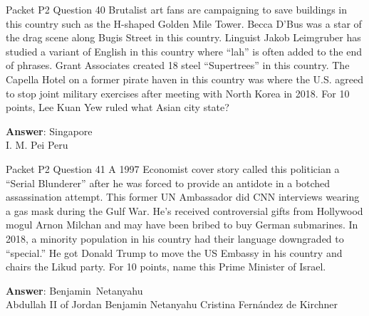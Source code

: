 \begin{frame}{Packet P2 Question 40}
Brutalist art fans are campaigning to save buildings in this country   such as the H-shaped Golden Mile Tower. Becca D'Bus was a star of the drag scene along Bugis Street in this country. Linguist Jakob Leimgruber has studied a variant of English in this country where ``lah'' is often added to the end of phrases. Grant Associates created 18 steel “Supertrees” in this country. The Capella Hotel on a former pirate haven in this country was where the U.S. agreed to stop joint military exercises after meeting with North Korea in 2018. For 10 points, Lee Kuan Yew ruled     what Asian city state?  

\textbf{Answer}: Singapore\\
 I. M. Pei
 Peru
\end{frame}

\begin{frame}{Packet P2 Question 41}
A 1997 Economist cover story called this politician a “Serial Blunderer” after he was forced to provide an antidote in a botched assassination attempt. This former   UN Ambassador did CNN interviews wearing a gas mask during the Gulf War. He’s received controversial gifts from Hollywood mogul Arnon Milchan and may have been bribed to buy German submarines. In 2018, a minority population in his country had their language downgraded to “special.” He got Donald Trump to move the US Embassy in his country and chairs the Likud party. For 10 points, name this Prime   Minister of Israel.    

\textbf{Answer}: Benjamin\ Netanyahu\\
 Abdullah II of Jordan
 Benjamin Netanyahu
 Cristina Fernández de Kirchner
\end{frame}

